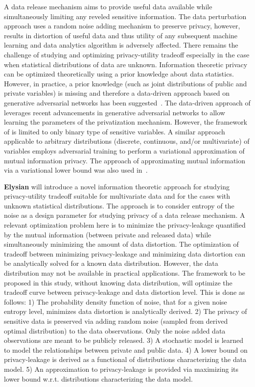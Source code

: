 \documentclass[a4paper,11pt]{article}
\newcommand{\project}[1]{\textbf{#1}\xspace}
\newcommand{\SECURITY}{\project{Elysian}}
\newcommand{\TheProject}{\SECURITY}
\begin{document}
A data release mechanism aims to provide useful data available while simultaneously limiting any reveled sensitive information. The data perturbation approach uses a random noise adding mechanism to preserve privacy, however, results in distortion of useful data and thus utility of any subsequent machine learning and data analytics algorithm is adversely affected. There remains the challenge of studying and optimizing privacy-utility tradeoff especially in the case when statistical distributions of data are unknown. Information theoretic privacy can be optimized theoretically using a prior knowledge about data statistics. However, in practice, a prior knowledge (such as joint distributions of public and private variables) is missing and therefore a data-driven approach based on generative adversarial networks has been suggested~\cite{Huang_2017}. The data-driven approach of \cite{Huang_2017} leverages recent advancements in generative adversarial networks to allow learning the parameters of the privatization mechanism. However, the framework of \cite{Huang_2017} is limited to only binary type of sensitive variables. A similar approach~\cite{8919758} applicable to arbitrary distributions (discrete, continuous, and/or multivariate) of variables employs adversarial training to perform a variational approximation of mutual information privacy. The approach of approximating mutual information via a variational lower bound was also used in~\cite{NIPS2016_6399}.         

\TheProject{} will introduce a novel information theoretic approach for studying privacy-utility tradeoff suitable for multivariate data and for the cases with unknown statistical distributions. The approach is to consider entropy of the noise as a design parameter for studying privacy of a data release mechanism. A relevant optimization problem here is to minimize the privacy-leakage quantified by the mutual information (between private and released data) while simultaneously minimizing the amount of data distortion. The optimization of tradeoff between minimizing privacy-leakage and minimizing data distortion can be analytically solved for a known data distribution. However, the data distribution may not be available in practical applications. The framework to be proposed in this study, without knowing data distribution, will optimize the tradeoff curve between privacy-leakage and data distortion level. This is done as follows: 1) The probability density function of noise, that for a given noise entropy level, minimizes data distortion is analytically derived. 2) The privacy of sensitive data is preserved via adding random noise (sampled from derived optimal distribution) to the data observations. Only the noise added data observations are meant to be publicly released. 3) A stochastic model is learned to model the relationships between private and public data. 4) A lower bound on privacy-leakage is derived as a functional of distributions characterizing the data model. 5) An approximation to privacy-leakage is provided via maximizing its lower bound w.r.t. distributions characterizing the data model.           
\end{document}
